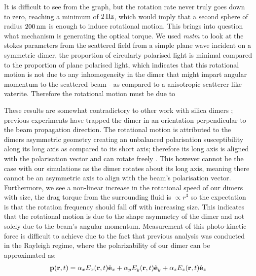It is difficult to see from the graph, but the rotation rate never
truly goes down to zero, reaching a minimum of $2\,{\rm Hz}$, which would
imply that a second sphere of radius $200\,{\rm nm}$ is enough to
induce rotational motion. This brings into question what mechanism is
generating the optical torque. We used \textit{mstm} to look at the stokes
parameters from the scattered field from a simple plane wave incident
on a symmetric dimer, the proportion of circularly polarised light is 
minimal compared to the proportion of plane polarised light, which 
indicates that this rotational motion is not due to any inhomogeneity 
in the dimer that might impart angular momentum to the scattered beam - 
as compared to a anisotropic scatterer like vaterite. Therefore the 
rotational motion must be due to 

These results are somewhat contradictory to other work with silica dimers
\cite{Ahn2018, Debuysschere2023,Reimann2018}; previous experiments
have trapped the dimer in an orientation perpendicular to the beam
propagation direction. The rotational motion is attributed to the
dimers asymmetric geometry creating an unbalanced polarisation susceptibility
along its long axis as compared to its short axis; therefore its long
axis is aligned with the polarisation vector and can rotate
freely \cite{Ahn2018}. This however cannot be the case with our
simulations as the dimer rotates about its long axis, meaning there
cannot be an asymmetric axis to align with the beam's polarisation
vector. Furthermore, we see a non-linear increase in the rotational
speed of our dimers with size, the drag torque from the surrounding
fluid is $\propto r^3$ so the expectation is that the rotation
frequency should fall off with increasing size.  This indicates that
the rotational motion is due to the shape asymmetry of the dimer and
not solely due to the beam's angular momentum.  Measurement of this
photo-kinetic force is difficult to achieve due to the fact that
previous analysis was conducted in the Rayleigh regime, where the
polarizability of our dimer can be approximated as:
\begin{align}
  \bold{p}({\bf r},t)
  =
  \alpha_x E_x({\bf r},t)\hat{\bf e}_x
  + \alpha_yE_y({\bf r},t)\hat{\bf e}_y
  + \alpha_zE_z({\bf r},t)\hat{\bf e}_z
\end{align}

